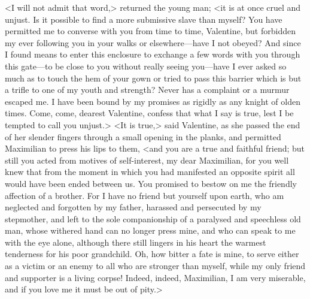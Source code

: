  <I will not admit that word,> returned the young man; <it is at once cruel and unjust. Is it possible to find a more submissive slave than myself? You have permitted me to converse with you from time to time, Valentine, but forbidden my ever following you in your walks or elsewhere—have I not obeyed? And since I found means to enter this enclosure to exchange a few words with you through this gate—to be close to you without really seeing you—have I ever asked so much as to touch the hem of your gown or tried to pass this barrier which is but a trifle to one of my youth and strength? Never has a complaint or a murmur escaped me. I have been bound by my promises as rigidly as any knight of olden times. Come, come, dearest Valentine, confess that what I say is true, lest I be tempted to call you unjust.>  <It is true,> said Valentine, as she passed the end of her slender fingers through a small opening in the planks, and permitted Maximilian to press his lips to them, <and you are a true and faithful friend; but still you acted from motives of self-interest, my dear Maximilian, for you well knew that from the moment in which you had manifested an opposite spirit all would have been ended between us. You promised to bestow on me the friendly affection of a brother. For I have no friend but yourself upon earth, who am neglected and forgotten by my father, harassed and persecuted by my stepmother, and left to the sole companionship of a paralysed and speechless old man, whose withered hand can no longer press mine, and who can speak to me with the eye alone, although there still lingers in his heart the warmest tenderness for his poor grandchild. Oh, how bitter a fate is mine, to serve either as a victim or an enemy to all who are stronger than myself, while my only friend and supporter is a living corpse! Indeed, indeed, Maximilian, I am very miserable, and if you love me it must be out of pity.> 

